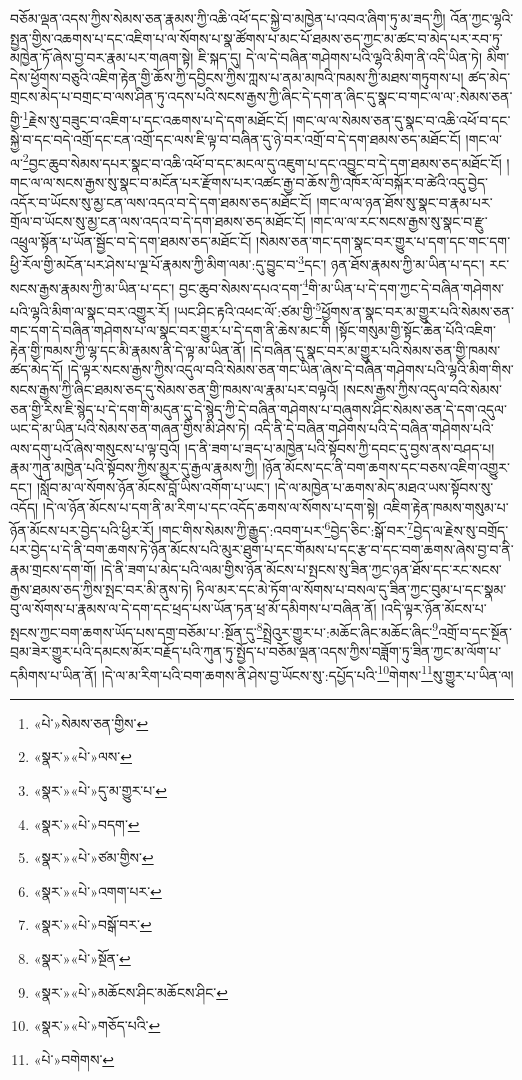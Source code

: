 བཅོམ་ལྡན་འདས་ཀྱིས་སེམས་ཅན་རྣམས་ཀྱི་འཆི་འཕོ་དང་སྐྱེ་བ་མཁྱེན་པ་འབའ་ཞིག་ཏུ་མ་ཟད་ཀྱི། འོན་ཀྱང་ལྷའི་སྤྱན་གྱིས་འཆགས་པ་དང་འཇིག་པ་ལ་སོགས་པ་སྣ་ཚོགས་པ་མང་པོ་ཐམས་ཅད་ཀྱང་མ་ཚང་བ་མེད་པར་རབ་ཏུ་མཁྱེན་ཏོ་ཞེས་བྱ་བར་རྣམ་པར་གཞག་སྟེ། ཇི་སྐད་དུ། དེ་ལ་དེ་བཞིན་གཤེགས་པའི་ལྷའི་མིག་ནི་འདི་ཡིན་ཏེ། མིག་དེས་ཕྱོགས་བཅུའི་འཇིག་རྟེན་གྱི་ཆོས་ཀྱི་དབྱིངས་ཀྱིས་ཀླས་པ་ནམ་མཁའི་ཁམས་ཀྱི་མཐས་གཏུགས་པ། ཚད་མེད་གྲངས་མེད་པ་བགྲང་བ་ལས་ཤིན་ཏུ་འདས་པའི་སངས་རྒྱས་ཀྱི་ཞིང་དེ་དག་ན་ཞིང་དུ་སྣང་བ་གང་ལ་ལ་:སེམས་ཅན་གྱི་\footnote{«པེ་»སེམས་ཅན་གྱིས་}རྗེས་སུ་བཟུང་བ་འཇིག་པ་དང་འཆགས་པ་དེ་དག་མཐོང་ངོ། །གང་ལ་ལ་སེམས་ཅན་དུ་སྣང་བ་འཆི་འཕོ་བ་དང་སྐྱེ་བ་དང་བདེ་འགྲོ་དང་ངན་འགྲོ་དང་ལས་ཇི་ལྟ་བ་བཞིན་དུ་ཉེ་བར་འགྲོ་བ་དེ་དག་ཐམས་ཅད་མཐོང་ངོ། །གང་ལ་ལ་\footnote{«སྣར་»«པེ་»ལས་}བྱང་ཆུབ་སེམས་དཔར་སྣང་བ་འཆི་འཕོ་བ་དང་མངལ་དུ་འཇུག་པ་དང་འབྱུང་བ་དེ་དག་ཐམས་ཅད་མཐོང་ངོ། །གང་ལ་ལ་སངས་རྒྱས་སུ་སྣང་བ་མངོན་པར་རྫོགས་པར་འཚང་རྒྱ་བ་ཆོས་ཀྱི་འཁོར་ལོ་བསྐོར་བ་ཚེའི་འདུ་བྱེད་འདོར་བ་ཡོངས་སུ་མྱ་ངན་ལས་འདའ་བ་དེ་དག་ཐམས་ཅད་མཐོང་ངོ། །གང་ལ་ལ་ཉན་ཐོས་སུ་སྣང་བ་རྣམ་པར་གྲོལ་བ་ཡོངས་སུ་མྱ་ངན་ལས་འདའ་བ་དེ་དག་ཐམས་ཅད་མཐོང་ངོ། །གང་ལ་ལ་རང་སངས་རྒྱས་སུ་སྣང་བ་རྫུ་འཕྲུལ་སྟོན་པ་ཡོན་སྦྱོང་བ་དེ་དག་ཐམས་ཅད་མཐོང་ངོ། །སེམས་ཅན་གང་དག་སྣང་བར་གྱུར་པ་དག་དང་གང་དག་ཕྱི་རོལ་གྱི་མངོན་པར་ཤེས་པ་ལྔ་པོ་རྣམས་ཀྱི་མིག་ལམ་:དུ་བྱུང་བ་\footnote{«སྣར་»«པེ་»དུ་མ་གྱུར་པ་}དང་། ཉན་ཐོས་རྣམས་ཀྱི་མ་ཡིན་པ་དང་། རང་སངས་རྒྱས་རྣམས་ཀྱི་མ་ཡིན་པ་དང་། བྱང་ཆུབ་སེམས་དཔའ་དག་\footnote{«སྣར་»«པེ་»བདག་}གི་མ་ཡིན་པ་དེ་དག་ཀྱང་དེ་བཞིན་གཤེགས་པའི་ལྷའི་མིག་ལ་སྣང་བར་འགྱུར་རོ། །ཡང་ཤིང་རྟའི་འཕང་ལོ་:ཙམ་གྱི་\footnote{«སྣར་»«པེ་»ཙམ་གྱིས་}ཕྱོགས་ན་སྣང་བར་མ་གྱུར་པའི་སེམས་ཅན་གང་དག་དེ་བཞིན་གཤེགས་པ་ལ་སྣང་བར་གྱུར་པ་དེ་དག་ནི་ཆེས་མང་གི །སྟོང་གསུམ་གྱི་སྟོང་ཆེན་པོའི་འཇིག་རྟེན་གྱི་ཁམས་ཀྱི་ལྷ་དང་མི་རྣམས་ནི་དེ་ལྟ་མ་ཡིན་ནོ། །དེ་བཞིན་དུ་སྣང་བར་མ་གྱུར་པའི་སེམས་ཅན་གྱི་ཁམས་ཚད་མེད་དོ། །དེ་ལྟར་སངས་རྒྱས་ཀྱིས་འདུལ་བའི་སེམས་ཅན་གང་ཡིན་ཞེས་དེ་བཞིན་གཤེགས་པའི་ལྷའི་མིག་གིས་སངས་རྒྱས་ཀྱི་ཞིང་ཐམས་ཅད་དུ་སེམས་ཅན་གྱི་ཁམས་ལ་རྣམ་པར་བལྟའོ། །སངས་རྒྱས་ཀྱིས་འདུལ་བའི་སེམས་ཅན་གྱི་རིས་ཇི་སྙེད་པ་དེ་དག་གི་མདུན་དུ་དེ་སྙེད་ཀྱི་དེ་བཞིན་གཤེགས་པ་བཞུགས་ཤིང་སེམས་ཅན་དེ་དག་འདུལ་ཡང་དེ་མ་ཡིན་པའི་སེམས་ཅན་གཞན་གྱིས་མི་ཤེས་ཏེ། འདི་ནི་དེ་བཞིན་གཤེགས་པའི་དེ་བཞིན་གཤེགས་པའི་ལས་དགུ་པའོ་ཞེས་གསུངས་པ་ལྟ་བུའོ། །ད་ནི་ཟག་པ་ཟད་པ་མཁྱེན་པའི་སྟོབས་ཀྱི་དབང་དུ་བྱས་ནས་བཤད་པ། རྣམ་ཀུན་མཁྱེན་པའི་སྟོབས་ཀྱིས་མྱུར་དུ་རྒྱལ་རྣམས་ཀྱི། །ཉོན་མོངས་དང་ནི་བག་ཆགས་དང་བཅས་འཇིག་འགྱུར་དང་། །སློབ་མ་ལ་སོགས་ཉོན་མོངས་བློ་ཡིས་འགོག་པ་ཡང་། །དེ་ལ་མཁྱེན་པ་ཆགས་མེད་མཐའ་ཡས་སྟོབས་སུ་འདོད། །དེ་ལ་ཉོན་མོངས་པ་དག་ནི་མ་རིག་པ་དང་འདོད་ཆགས་ལ་སོགས་པ་དག་སྟེ། འཇིག་རྟེན་ཁམས་གསུམ་པ་ཉོན་མོངས་པར་བྱེད་པའི་ཕྱིར་རོ། །གང་གིས་སེམས་ཀྱི་རྒྱུད་:འབག་པར་\footnote{«སྣར་»«པེ་»འགག་པར་}བྱེད་ཅིང་:སྒོ་བར་\footnote{«སྣར་»«པེ་»བསྒོ་བར་}བྱེད་ལ་རྗེས་སུ་བགྲོད་པར་བྱེད་པ་དེ་ནི་བག་ཆགས་ཏེ་ཉོན་མོངས་པའི་མུར་ཐུག་པ་དང་གོམས་པ་དང་རྩ་བ་དང་བག་ཆགས་ཞེས་བྱ་བ་ནི་རྣམ་གྲངས་དག་གོ། །དེ་ནི་ཟག་པ་མེད་པའི་ལམ་གྱིས་ཉོན་མོངས་པ་སྤངས་སུ་ཟིན་ཀྱང་ཉན་ཐོས་དང་རང་སངས་རྒྱས་ཐམས་ཅད་ཀྱིས་སྤང་བར་མི་ནུས་ཏེ། ཏིལ་མར་དང་མེ་ཏོག་ལ་སོགས་པ་བསལ་དུ་ཟིན་ཀྱང་བུམ་པ་དང་སྣམ་བུ་ལ་སོགས་པ་རྣམས་ལ་དེ་དག་དང་ཕྲད་པས་ཡོན་ཏན་ཕྲ་མོ་དམིགས་པ་བཞིན་ནོ། །འདི་ལྟར་ཉོན་མོངས་པ་སྤངས་ཀྱང་བག་ཆགས་ཡོད་པས་དགྲ་བཅོམ་པ་:སྔོན་དུ་\footnote{«སྣར་»«པེ་»སྔོན་}སྤྲེའུར་གྱུར་པ་:མཆོང་ཞིང་མཆོང་ཞིང་\footnote{«སྣར་»«པེ་»མཆོངས་ཤིང་མཆོངས་ཤིང་}འགྲོ་བ་དང་སྔོན་བྲམ་ཟེར་གྱུར་པའི་དམངས་མོར་བརྗོད་པའི་ཀུན་ཏུ་སྤྱོད་པ་བཅོམ་ལྡན་འདས་ཀྱིས་བཟློག་ཏུ་ཟིན་ཀྱང་མ་ལོག་པ་དམིགས་པ་ཡིན་ནོ། །དེ་ལ་མ་རིག་པའི་བག་ཆགས་ནི་ཤེས་བྱ་ཡོངས་སུ་:དཔྱོད་པའི་\footnote{«སྣར་»«པེ་»གཅོད་པའི་}གེགས་\footnote{«པེ་»བགེགས་}སུ་གྱུར་པ་ཡིན་ལ། 